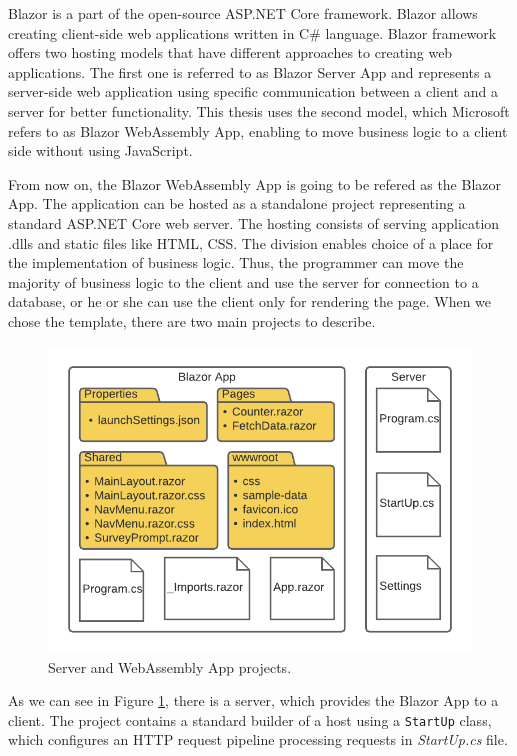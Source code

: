 Blazor is a part of the open-source ASP.NET Core framework.
Blazor allows creating client-side web applications written in C\# language.
Blazor framework offers two hosting models \cite{online:hostingModels} that have different approaches to creating web applications. 
The first one is referred to as Blazor Server App and represents a server-side web application using specific communication between a client and a server for better functionality.
This thesis uses the second model, which Microsoft refers to as Blazor WebAssembly App, enabling to move business logic to a client side without using JavaScript.
\par
From now on, the Blazor WebAssembly App is going to be refered as the Blazor App.
The application can be hosted as a standalone project representing a standard ASP.NET Core web server.
The hosting consists of serving application .dlls and static files like HTML, CSS.
The division enables choice of a place for the implementation of business logic.
Thus, the programmer can move the majority of business logic to the client and use the server for connection to a database, or he or she can use the client only for rendering the page.
When we chose the template, there are two main projects to describe.
\par
\begin{figure}\centering
\includegraphics{./img/ProjectStructure}
\caption{Server and WebAssembly App projects.}
\label{img04:projects}
\end{figure} 
\par
As we can see in Figure \ref{img04:projects}, there is a server, which provides the Blazor App to a client.
The project contains a standard builder of a host using a \texttt{StartUp} class, which configures an HTTP request pipeline processing requests in \textit{StartUp.cs} file.
